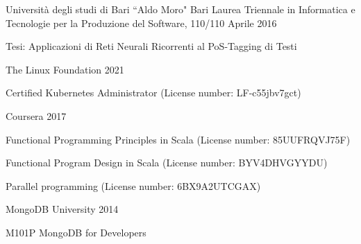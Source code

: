 \documentclass{resume} %
\begin{document}
\cvEntry
  {Universit\`a degli studi di Bari ``Aldo Moro"}
  {Bari}
  {Laurea Triennale in Informatica e Tecnologie per la Produzione del Software, 110/110}
  {Aprile 2016}{
    \begin{cvEntryItems}
      Tesi: Applicazioni di Reti Neurali Ricorrenti al PoS-Tagging di Testi
    \end{cvEntryItems}
}





\cvEntry
  {The Linux Foundation}
  {2021}{}{}{
    \begin{cvEntryItems}
      \item Certified Kubernetes Administrator (License number: LF-c55jbv7gct)
    \end{cvEntryItems}
  }


\cvEntry
  {Coursera}
  {2017}{}{}{
    \begin{cvEntryItems}
      \item Functional Programming Principles in Scala (License number: 85UUFRQVJ75F)
      \item Functional Program Design in Scala (License number: BYV4DHVGYYDU)
      \item Parallel programming (License number: 6BX9A2UTCGAX)
    \end{cvEntryItems}
  }


\cvEntry
  {MongoDB University}
  {2014}{}{}{
    \begin{cvEntryItems}
      \item M101P MongoDB for Developers
    \end{cvEntryItems}
  }

\end{document}
